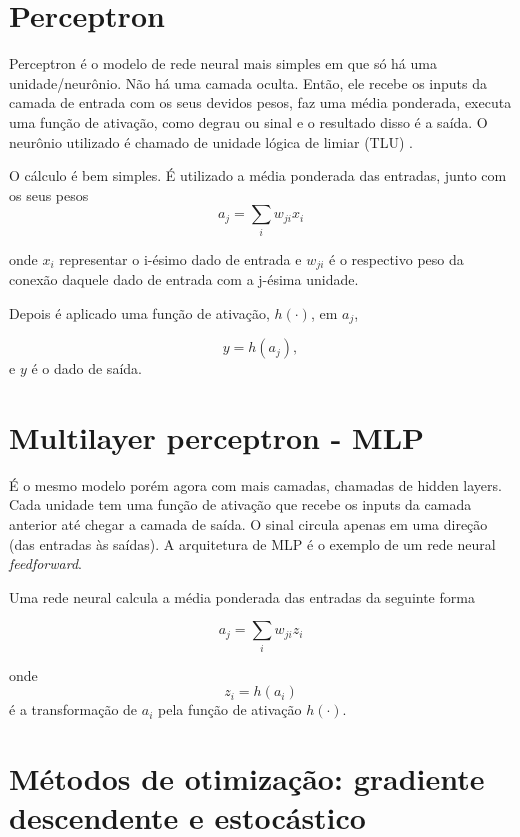 \documentclass[12pt,titlepage]{article}
\title{}
\author{Mickael Pires de Pinho}
\begin{document}
\section{Perceptron}

Perceptron é o modelo de rede neural mais simples em que só há uma unidade/neurônio. Não há uma camada oculta. Então, ele recebe os inputs da camada de entrada com os seus devidos pesos, faz uma média ponderada, executa uma função de ativação, como degrau ou sinal e o resultado disso é a saída. O neurônio utilizado é chamado de unidade lógica de limiar (TLU) \cite{Geron2021}.

O cálculo é bem simples. É utilizado a média ponderada das entradas, junto com os seus pesos \cite{bonaccorso2018mastering}
\begin{equation}
a_j = \sum_i w_{ji} x_i
\end{equation}

onde $x_i$ representar o i-ésimo dado de entrada e $w_{ji}$ é o respectivo peso da conexão daquele dado de entrada com a j-ésima unidade.

Depois é aplicado uma função de ativação, $h(\cdot)$, em $a_j$,

\begin{equation}
	y = h(a_j),
\end{equation}
e $y$ é o dado de saída.
\section{Multilayer perceptron - MLP}

É o mesmo modelo porém agora com mais camadas, chamadas de hidden layers. Cada unidade tem uma função de ativação que recebe os inputs da camada anterior até chegar a camada de saída. O sinal circula apenas em uma direção (das entradas às saídas). A arquitetura de MLP é o exemplo de um rede neural \textit{feedforward}\cite{Geron2021}.

Uma rede neural calcula a média ponderada das entradas da seguinte forma 

\begin{equation}
	\label{eq: media ponderada dos pesos ffnn}
	a_j = \sum_i w_{ji} z_i
\end{equation}

onde $$z_i = h(a_i)$$ é a transformação de $a_i$ pela função de ativação $h(\cdot)$.

\section{Métodos de otimização: gradiente descendente e estocástico}
\end{document}
